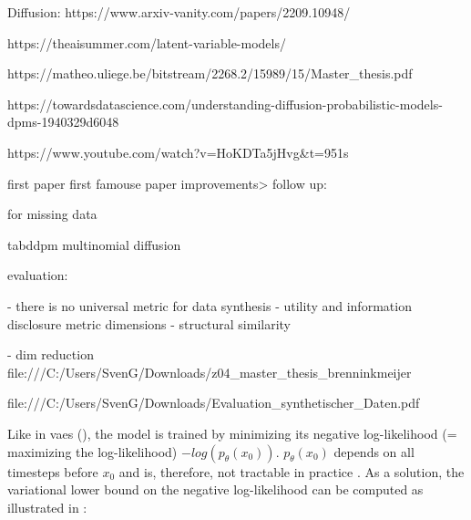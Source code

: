 Diffusion:
https://www.arxiv-vanity.com/papers/2209.10948/

https://theaisummer.com/latent-variable-models/

https://matheo.uliege.be/bitstream/2268.2/15989/15/Master_thesis.pdf

https://towardsdatascience.com/understanding-diffusion-probabilistic-models-dpms-1940329d6048 

https://www.youtube.com/watch?v=HoKDTa5jHvg&t=951s


first paper \cite{sohl-dickstein2015DeepUnsupervisedLearning}
first famouse paper \cite{ho2020DenoisingDiffusionProbabilistic}
improvements> \cite{nichol2021ImprovedDenoisingDiffusion}
follow up: \cite{dhariwal2021DiffusionModelsBeat}

\cite{ho2022ClassifierFreeDiffusionGuidance}

\cite{rombach2022HighResolutionImageSynthesis}



\cite{zheng2022DiffusionModelsMissing} for missing data

\cite{kotelnikov2022TabDDPMModellingTabular} tabddpm
\cite{hoogeboom2021ArgmaxFlowsMultinomial} multinomial diffusion


evaluation:

- there is no universal metric for data synthesis \cite{hernandez2022SyntheticDataGeneration}
- utility and information disclosure metric dimensions \cite{goncalves2020GenerationEvaluationSynthetic}
- structural similarity \cite{elemam2020SevenWaysEvaluate}

- dim reduction
file:///C:/Users/SvenG/Downloads/z04_master_thesis_brenninkmeijer%

file:///C:/Users/SvenG/Downloads/Evaluation_synthetischer_Daten.pdf




Like in \glspl{vae} (), the model is trained by minimizing its negative log-likelihood (= maximizing the log-likelihood) $-log(p_\theta(x_0))$.
$p_\theta(x_0)$ depends on all timesteps before $x_0$ and is, therefore, not tractable in practice \cite{zbinden2022ImplementingExperimentingDiffusion}.
As a solution, the variational lower bound on the negative log-likelihood can be computed as illustrated in : %

